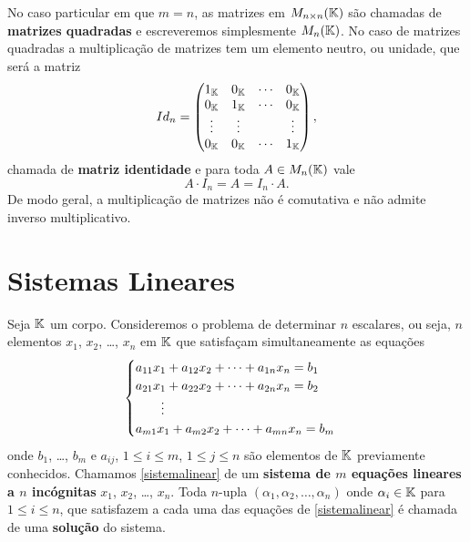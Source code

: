 No caso particular em que $m = n$, as matrizes em $M_{n\times n}(\mathbb{K})$ s\~ao chamadas de \textbf{matrizes quadradas} e escreveremos simplesmente $M_n(\mathbb{K})$. No caso de matrizes quadradas a multiplica\c{c}\~ao de matrizes tem um elemento neutro, ou unidade, que ser\'a a matriz
\[
	Id_n = \begin{pmatrix}
		1_{\mathbb{K}} & 0_{\mathbb{K}} & \cdots & 0_{\mathbb{K}}\\
		0_{\mathbb{K}} & 1_{\mathbb{K}} & \cdots & 0_{\mathbb{K}}\\
		\vdots & \vdots & & \vdots\\
		0_{\mathbb{K}} & 0_{\mathbb{K}} & \cdots & 1_{\mathbb{K}}
	\end{pmatrix},
\]
chamada de \textbf{matriz identidade} e para toda $A \in M_n(\mathbb{K})$ vale
\[
	A\cdot I_n = A = I_n\cdot A.
\]
De modo geral, a multiplica\c{c}\~ao de matrizes n\~ao \'e comutativa e n\~ao admite inverso multiplicativo.

\section{Sistemas Lineares}\label{ssub:sistemas_lineares}
Seja $\mathbb{K}$ um corpo. Consideremos o problema de determinar $n$ escalares, ou seja, $n$ elementos $x_1$, $x_2$, \dots, $x_n$ em $\mathbb{K}$ que satisfa\c{c}am simultaneamente as equa\c{c}\~oes
\begin{equation}\label{sistemalinear}\index{Sistema Linear}
	\begin{cases}
		a_{11}x_1 + a_{12}x_2 + \cdots + a_{1n}x_n = b_1\\
		a_{21}x_1 + a_{22}x_2 + \cdots + a_{2n}x_n = b_2\\
		\qquad \vdots\\
		a_{m1}x_1 + a_{m2}x_2 + \cdots + a_{mn}x_n = b_m\\
	\end{cases}
\end{equation}
onde $b_1$, \dots, $b_m$ e $a_{ij}$, $1 \le i \le m$, $1 \le j \le n$ s\~ao elementos de $\mathbb{K}$ previamente conhecidos. Chamamos \eqref{sistemalinear} de um \textbf{sistema de $m$ equa\c{c}\~oes lineares a $n$ inc\'ognitas} $x_1$, $x_2$, \dots, $x_n$. Toda $n$-upla $(\alpha_1, \alpha_2, \dots, \alpha_n)$ onde $\alpha_i \in \mathbb{K}$ para $1 \le i \le n$, que satisfazem a cada uma das equa\c{c}\~oes de \eqref{sistemalinear} \'e chamada de uma \textbf{solu\c{c}\~ao} do sistema. 

